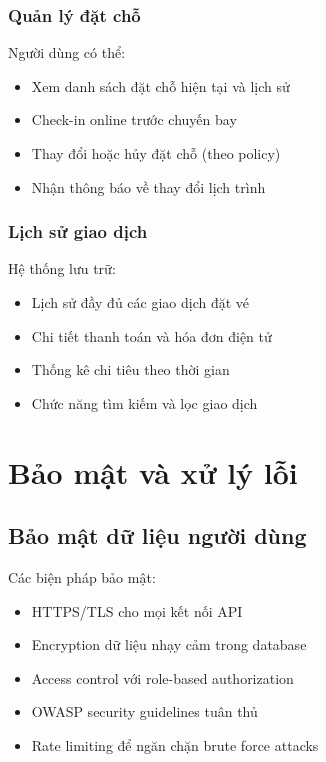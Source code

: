 \subsubsection{Quản lý đặt chỗ}
Người dùng có thể:

\begin{itemize}[leftmargin=1cm]
    \item Xem danh sách đặt chỗ hiện tại và lịch sử
    \item Check-in online trước chuyến bay
    \item Thay đổi hoặc hủy đặt chỗ (theo policy)
    \item Nhận thông báo về thay đổi lịch trình
\end{itemize}

\subsubsection{Lịch sử giao dịch}
Hệ thống lưu trữ:

\begin{itemize}[leftmargin=1cm]
    \item Lịch sử đầy đủ các giao dịch đặt vé
    \item Chi tiết thanh toán và hóa đơn điện tử
    \item Thống kê chi tiêu theo thời gian
    \item Chức năng tìm kiếm và lọc giao dịch
\end{itemize}

\section{Bảo mật và xử lý lỗi}

\subsection{Bảo mật dữ liệu người dùng}
Các biện pháp bảo mật:

\begin{itemize}[leftmargin=1cm]
    \item HTTPS/TLS cho mọi kết nối API
    \item Encryption dữ liệu nhạy cảm trong database
    \item Access control với role-based authorization
    \item OWASP security guidelines tuân thủ
    \item Rate limiting để ngăn chặn brute force attacks
\end{itemize}

